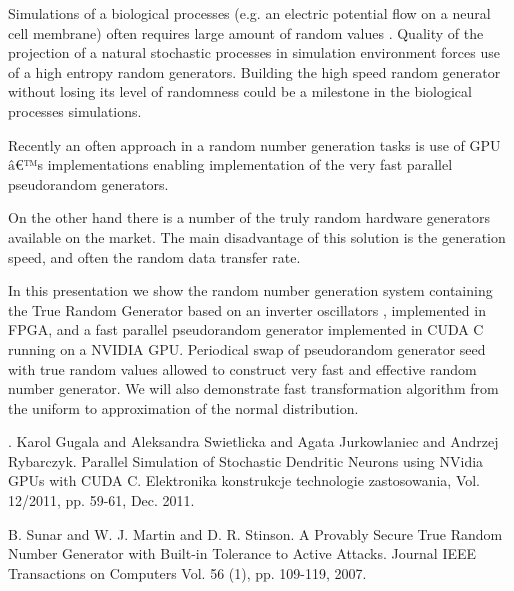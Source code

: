Simulations of a biological processes (e.g. an electric potential flow on a neural cell membrane) often requires large amount of random values \cite{gugala2011}. Quality of the projection of a natural stochastic processes in simulation environment forces use of a high entropy random generators. Building the high speed random generator without losing its level of randomness could be a milestone in the biological processes simulations. 	\par Recently an often approach in a random number generation tasks is use of GPU$â€™$s implementations enabling implementation of the very fast parallel pseudorandom generators. \par On the other hand there is a number of the truly random hardware generators available on the market. The main disadvantage of this solution is the generation speed, and often the random data transfer rate.\par In this presentation we show the random number generation system containing the True Random Generator based on an inverter oscillators \cite{sunar2007}, implemented in FPGA, and a fast parallel pseudorandom generator implemented in CUDA C running on a NVIDIA GPU. Periodical swap of pseudorandom generator seed with true random values allowed to construct very fast and effective random number generator. We will also demonstrate fast transformation algorithm from the uniform to approximation of the normal distribution.


\begin{thebibliography}{10}

{. Karol Gugala and Aleksandra Swietlicka and Agata Jurkowlaniec and Andrzej Rybarczyk}. {Parallel Simulation of Stochastic Dendritic Neurons using NVidia GPUs with CUDA C}. Elektronika konstrukcje technologie zastosowania, Vol. 12/2011, pp. 59-61, Dec. 2011.



{\sc B. Sunar and W. J. Martin and D. R. Stinson}. {A Provably Secure True Random Number Generator with Built-in Tolerance to Active Attacks}. Journal IEEE Transactions on Computers Vol. 56 (1), pp. 109-119, 2007.

\end{thebibliography}
